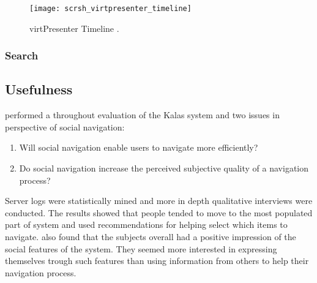 \begin{figure}
  \centering
  \texttt{[image: scrsh\_virtpresenter\_timeline]}
  \caption[virtPresenter Timeline]{
    virtPresenter Timeline \citep[p.~43]{mertens06}.
  }
  \label{figure:scrsh.virtpresenter.timeline}
\end{figure}


\subsubsection{Search}

\subsection{Usefulness}

\citet{svensson05} performed a throughout evaluation of the Kalas system and
two issues in perspective of social navigation:

\begin{enumerate}
  \item Will social navigation enable users to navigate more efficiently?
  \item Do social navigation increase the perceived subjective quality of
    a navigation process?
\end{enumerate}

Server logs were statistically mined and more in depth qualitative interviews
were conducted. The results showed that people tended to move to the most
populated part of system and used recommendations for helping select which
items to navigate. \citeauthor{svensson05} also found that the subjects
overall had a positive impression of the social features of the system. They
seemed more interested in expressing themselves trough such features than
using information from others to help their navigation process.

